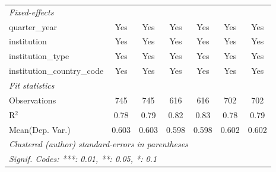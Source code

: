 \begin{tabular}{lcccccc}
   \midrule
   \emph{Fixed-effects}\\
   quarter\_year                      & Yes     & Yes           & Yes        & Yes          & Yes     & Yes\\  
   institution                        & Yes     & Yes           & Yes        & Yes          & Yes     & Yes\\  
   institution\_type                  & Yes     & Yes           & Yes        & Yes          & Yes     & Yes\\  
   institution\_country\_code         & Yes     & Yes           & Yes        & Yes          & Yes     & Yes\\  
   \midrule
   \emph{Fit statistics}\\
   Observations                       & 745     & 745           & 616        & 616          & 702     & 702\\  
   R$^2$                              & 0.78    & 0.79          & 0.82       & 0.83         & 0.78    & 0.79\\  
Mean(Dep. Var.) & 0.603 & 0.603 & 0.598 & 0.598 & 0.602 & 0.602 \\
   \midrule \midrule
   \multicolumn{7}{l}{\emph{Clustered (author) standard-errors in parentheses}}\\
   \multicolumn{7}{l}{\emph{Signif. Codes: ***: 0.01, **: 0.05, *: 0.1}}\\
\end{tabular}
\par\endgroup
